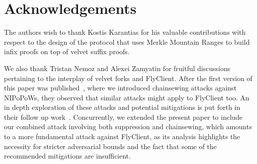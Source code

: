 \section{Acknowledgements}

The authors wish to thank Kostis Karantias for his valuable contributions with respect to
the design of the protocol that uses Merkle Mountain Ranges to build infix proofs on top
of velvet suffix proofs.

We also thank Tristan Nemoz and Alexei Zamyatin
for fruitful discussions pertaining to the interplay of
velvet forks and FlyClient.
After the first version of this paper was
published~\cite{velvet-nipopows-old}, where
we introduced chainsewing attacks against NIPoPoWs,
they observed that similar attacks
might apply to FlyClient too.
An in depth exploration of these attacks and potential mitigations
is put forth in their follow up work~\cite{velvet-flyclient}.
Concurrently, we extended the present paper to include
our combined attack involving both suppression and chainsewing,
which amounts to a more fundamental attack against FlyClient,
as its analysis highlights the necessity for stricter adversarial bounds
and the fact that some of the recommended mitigations are insufficient.

